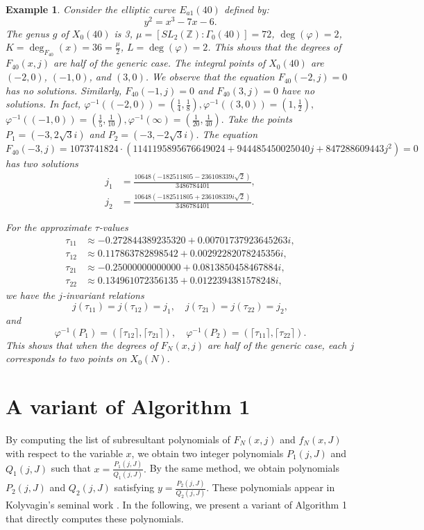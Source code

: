 \documentclass[10pt, a4paper]{article}
\newtheorem{example}[theorem]{Example}
\begin{document}
\begin{example}
Consider the elliptic curve $E_{a1}(40)$ defined by:
\[ y^2 = x^3 - 7x - 6. \]
The genus $g$ of $X_{0}(40)$  is 3,
$\mu = [SL_2(\mathbb{Z}):\Gamma_0(40)] = 72$,
 $\deg(\varphi) =2$,
$K = \deg_{F_{40}}(x) = 36 =  \frac{\mu}{2}$, $L =  \deg(\varphi) =2$.
This shows that the degrees of $F_{40}(x, j)$  are  half of the generic case.
The integral points of $X_0(40)$ are $(-2, 0)$, $(-1, 0)$, and $(3, 0)$. We observe that the equation $F_{40}(-2, j) = 0$  has no solutions.
 Similarly, $F_{40}(-1, j) = 0$ and $F_{40}(3, j) = 0$ have no solutions.
In fact,
$\varphi^{-1}((-2, 0)) = \left(\frac{1}{4}, \frac{1}{8}\right),
\varphi^{-1}((3, 0)) = \left(1, \frac{1}{2}\right), $
$\varphi^{-1}((-1, 0))= \left(\frac{1}{5}, \frac{1}{10}\right),
\varphi^{-1}(\infty) = \left(\frac{1}{20}, \frac{1}{40}\right).
$
Take the points $P_1 = (-3, 2\sqrt{3}i)$ and $P_2 = (-3, -2\sqrt{3}i)$.
The equation
$ F_{40}(-3, j) = 1073741824 \cdot (1141195895676649024 +
 944485450025040j + 847288609443j^2) = 0
$
has two solutions
\begin{align*}
j_1 &= \frac{10648(-182511805 - 236108339i\sqrt{2})}{3486784401}, \\
j_2 &= \frac{10648(-182511805 + 236108339i\sqrt{2})}{3486784401}.
\end{align*}

For the approximate $\tau$-values
\begin{align*}
\tau_{11} &\approx -0.272844389235320 + 0.00701737923645263i, \\
\tau_{12} &\approx 0.117863782898542 + 0.00292282078245356i, \\
\tau_{21} &\approx -0.25000000000000 + 0.0813850458467884i, \\
\tau_{22} &\approx 0.134961072356135 + 0.0122394381578248i,
\end{align*}
we have the $j$-invariant relations
\[ j(\tau_{11}) = j(\tau_{12}) = j_1, \quad j(\tau_{21}) = j(\tau_{22}) = j_2, \]
and
\[ \varphi^{-1}(P_1) = (\lceil \tau_{12} \rceil, \lceil \tau_{21} \rceil), \quad \varphi^{-1}(P_2) = (\lceil \tau_{11} \rceil, \lceil \tau_{22} \rceil). \]
This shows that when the degrees of $F_N(x, j)$ are half of the generic case, each $j$ corresponds to two points  on $X_0(N)$.
\end{example}
\section{ A variant  of  Algorithm 1}
By computing  the  list of  subresultant polynomials
of $F_N(x, j)$ and $f_N(x, J)$ with respect to the variable $x$, we obtain two integer polynomials $P_1(j, J)$ and $Q_1(j, J)$ such that $x = \frac{P_1(j, J)}{Q_1(j, J)}. $  By the same method, we obtain polynomials $P_2(j, J)$ and $Q_2(j, J)$ satisfying
$ y = \frac{P_2(j, J)}{Q_2(j, J)}. $ These polynomials appear in Kolyvagin's seminal work \cite{Kolyvagin}.  In the following, we present a variant of Algorithm 1 that directly computes these polynomials.
\end{document}
